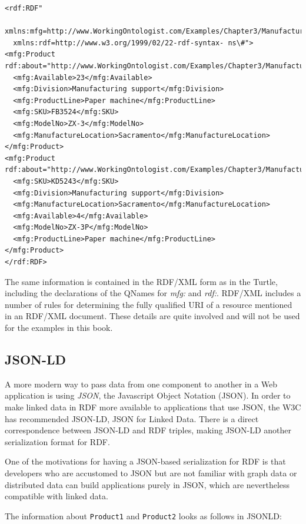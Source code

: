 \begin{lstlisting}
<rdf:RDF" 
  xmlns:mfg=http://www.WorkingOntologist.com/Examples/Chapter3/Manufacturing\#"
  xmlns:rdf=http://www.w3.org/1999/02/22-rdf-syntax- ns\#">
<mfg:Product rdf:about="http://www.WorkingOntologist.com/Examples/Chapter3/Manufacturing\#Product1">
  <mfg:Available>23</mfg:Available>
  <mfg:Division>Manufacturing support</mfg:Division>
  <mfg:ProductLine>Paper machine</mfg:ProductLine>
  <mfg:SKU>FB3524</mfg:SKU>
  <mfg:ModelNo>ZX-3</mfg:ModelNo>
  <mfg:ManufactureLocation>Sacramento</mfg:ManufactureLocation>
</mfg:Product>
<mfg:Product rdf:about="http://www.WorkingOntologist.com/Examples/Chapter3/Manufacturing\#Product2">
  <mfg:SKU>KD5243</mfg:SKU>
  <mfg:Division>Manufacturing support</mfg:Division>
  <mfg:ManufactureLocation>Sacramento</mfg:ManufactureLocation>
  <mfg:Available>4</mfg:Available>
  <mfg:ModelNo>ZX-3P</mfg:ModelNo>
  <mfg:ProductLine>Paper machine</mfg:ProductLine>
</mfg:Product> 
</rdf:RDF>
\end{lstlisting}

The same information is contained in the RDF/XML form as in the Turtle,
including the declarations of the QNames for \emph{mfg:} and \emph{rdf:}. RDF/XML
includes a number of rules for determining the fully qualified URI of a
resource mentioned in an RDF/XML document. These details are quite
involved and will not be used for the examples in this book.

\subsection{JSON-LD}

A more modern way to pass data from one component to another in a Web
application is using \emph{JSON}, the Javascript Object Notation (JSON). In
order to make linked data in RDF more available to applications that use
JSON, the W3C has recommended JSON-LD, JSON for Linked Data. There is a
direct correspondence between JSON-LD and RDF triples, making JSON-LD
another serialization format for RDF.

One of the motivations for having a JSON-based serialization for RDF is
that developers who are accustomed to JSON but are not familiar with
graph data or distributed data can build applications purely in JSON,
which are nevertheless compatible with linked data.

The information about \texttt{Product1} and \texttt{Product2} looks as follows in JSONLD:

